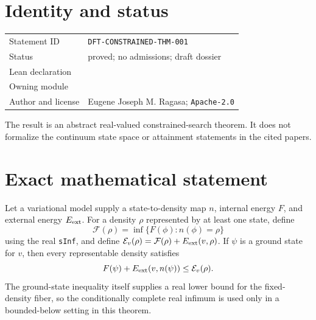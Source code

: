
\section{Identity and status}
\begin{tabularx}{\textwidth}{@{}lY@{}}
\toprule
Statement ID & \texttt{DFT-CONSTRAINED-THM-001} \\
Status & proved; no admissions; draft dossier \\
Lean declaration &  \\
Owning module &  \\
Author and license & Eugene Joseph M. Ragasa; \texttt{Apache-2.0} \\
\bottomrule
\end{tabularx}
The result is an abstract real-valued constrained-search theorem.  It does not formalize the
continuum state space or attainment statements in the cited papers.

\section{Exact mathematical statement}
Let a variational model supply a state-to-density map \(n\), internal energy \(F\), and external
energy \(E_{\rm ext}\).  For a density \(\rho\) represented by at least one state, define
\[
 \mathcal F(\rho)=\inf\{F(\phi):n(\phi)=\rho\}
\]
using the real \texttt{sInf}, and define
\(\mathcal E_v(\rho)=\mathcal F(\rho)+E_{\rm ext}(v,\rho)\).
If \(\psi\) is a ground state for \(v\), then every representable density satisfies
\[
 F(\psi)+E_{\rm ext}(v,n(\psi))\le \mathcal E_v(\rho).
\]
The ground-state inequality itself supplies a real lower bound for the fixed-density fiber, so the
conditionally complete real infimum is used only in a bounded-below setting in this theorem.

